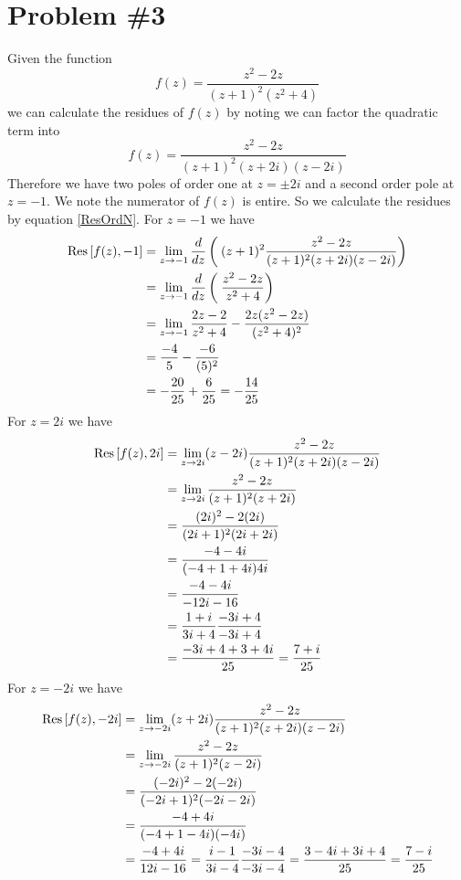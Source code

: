 \documentclass[11pt]{article}
\numberwithin{equation}{section}
\begin{document}
\pagebreak

\section{Problem \#3}
Given the function 
$$f(z) = \frac{z^2-2z}{(z+1)^2(z^2+4)}$$
we can calculate the residues of $f(z)$ by noting we can factor the quadratic term into
$$f(z) = \frac{z^2-2z}{(z+1)^2(z+2i)(z-2i)}$$
Therefore we have two poles of order one at $z=\pm2i$ and a second order pole at $z=-1$. We 
note the numerator of $f(z)$ is entire. So we calculate the residues by equation 
\ref{ResOrdN}. For $z=-1$ we have
\begin{align*}
\textnormal{Res}\left[{f(z)},{-1}\right] &= \lim_{z\rightarrow{-1}}\frac{d}{dz}\left(\frac{}{}(z+1)^2\frac{z^2-2z}{(z+1)^2(z+2i)(z-2i)}\right)\\
&= \lim_{z\rightarrow{-1}}\frac{d}{dz}\left(\frac{}{}\frac{z^2-2z}{z^2+4}\right)\\
&= \lim_{z\rightarrow{-1}}\frac{2z-2}{z^2+4} - \frac{2z(z^2-2z)}{(z^2+4)^2}\\
&= \frac{-4}{5} - \frac{-6}{(5)^2}\\
&= -\frac{20}{25} + \frac{6}{25} = -\frac{14}{25}
\end{align*}
For $z=2i$ we have
\begin{align*}
\textnormal{Res}\left[{f(z)},{2i}\right] &= \lim_{z\rightarrow{2i}}(z-2i)\frac{z^2-2z}{(z+1)^2(z+2i)(z-2i)}\\
&= \lim_{z\rightarrow{2i}}\frac{z^2-2z}{(z+1)^2(z+2i)}\\
&= \frac{(2i)^2-2(2i)}{(2i+1)^2(2i+2i)}\\
&= \frac{-4-4i}{(-4+1+4i)4i}\\
&= \frac{-4-4i}{-12i-16}\\
&= \frac{1+i}{3i+4}\frac{-3i+4}{-3i+4}\\
&= \frac{-3i+4+3+4i}{25} = \frac{7+i}{25}
\end{align*}
For $z=-2i$ we have
\begin{align*}
\textnormal{Res}\left[{f(z)},{-2i}\right] &= \lim_{z\rightarrow{-2i}}(z+2i)\frac{z^2-2z}{(z+1)^2(z+2i)(z-2i)}\\
&= \lim_{z\rightarrow{-2i}}\frac{z^2-2z}{(z+1)^2(z-2i)}\\
&= \frac{(-2i)^2-2(-2i)}{(-2i+1)^2(-2i-2i)}\\
&= \frac{-4+4i}{(-4+1-4i)(-4i)}\\
&= \frac{-4+4i}{12i-16} = \frac{i-1}{3i-4}\frac{-3i-4}{-3i-4} = \frac{3-4i+3i+4}{25} = \frac{7-i}{25}
\end{align*}
\end{document}

